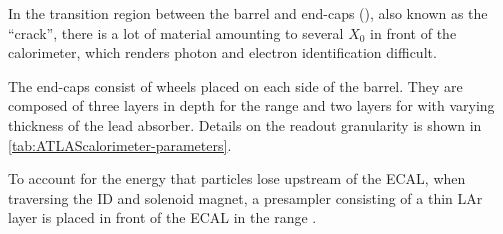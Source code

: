

In the transition region between the barrel and end-caps (), also known as the ``crack'', there is a lot of material amounting to several $X_0$ in front of the calorimeter, which renders photon and electron identification difficult.

The end-caps consist of wheels placed on each side of the barrel.
They are composed of three layers in depth for the range  and two layers for  with varying thickness of the lead absorber. Details on the readout granularity is shown in \cref{tab:ATLAScalorimeter-parameters}.

To account for the energy that particles lose upstream of the ECAL, when traversing the ID and solenoid magnet, a presampler consisting of a thin LAr layer is placed in front of the ECAL in the range .


